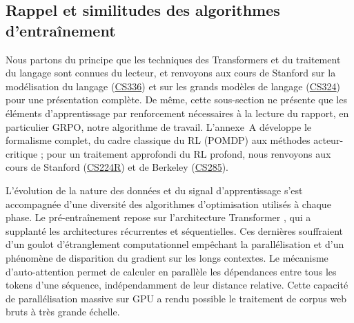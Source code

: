 \documentclass[11pt,a4paper]{article}
\begin{document}
\subsection{Rappel et similitudes des algorithmes d'entraînement}

Nous partons du principe que les techniques des Transformers et du traitement du langage sont connues du lecteur, et renvoyons aux cours de Stanford sur la modélisation du langage (\href{https://cs336.stanford.edu/}{CS336}) et sur les grands modèles de langage (\href{https://stanford-cs324.github.io/winter2022/}{CS324}) pour une présentation complète. De même, cette sous-section ne présente que les éléments d'apprentissage par renforcement nécessaires à la lecture du rapport, en particulier GRPO, notre algorithme de travail. L'annexe~A développe le formalisme complet, du cadre classique du RL (POMDP) aux méthodes acteur-critique ; pour un traitement approfondi du RL profond, nous renvoyons aux cours de Stanford (\href{https://cs224r.stanford.edu/}{CS224R}) et de Berkeley (\href{https://rail.eecs.berkeley.edu/deeprlcourse/}{CS285}).

L'évolution de la nature des données et du signal d'apprentissage s'est accompagnée d'une diversité des algorithmes d'optimisation utilisés à chaque phase. Le pré-entraînement repose sur l'architecture Transformer \cite{vaswani2017attention}, qui a supplanté les architectures récurrentes et séquentielles. Ces dernières souffraient d'un goulot d'étranglement computationnel empêchant la parallélisation et d'un phénomène de disparition du gradient sur les longs contextes. Le mécanisme d'auto-attention permet de calculer en parallèle les dépendances entre tous les tokens d'une séquence, indépendamment de leur distance relative. Cette capacité de parallélisation massive sur GPU a rendu possible le traitement de corpus web bruts à très grande échelle.
\end{document}
